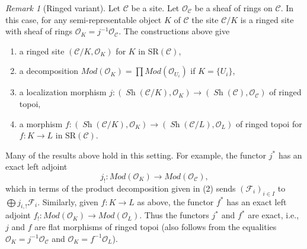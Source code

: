 \documentclass{stacks-project}
\theoremstyle{plain}
\theoremstyle{definition}
\theoremstyle{remark}
\newtheorem{remark}[subsection]{Remark}
\numberwithin{equation}{subsection}
\def\Sh{\mathop{\mathit{Sh}}\nolimits}
\begin{document}
\begin{remark}[Ringed variant]
\label{remark-semi-representable-ringed}
Let $\mathcal{C}$ be a site. Let $\mathcal{O}_\mathcal{C}$
be a sheaf of rings on $\mathcal{C}$. In this case, for any
semi-representable object $K$ of $\mathcal{C}$ the site
$\mathcal{C}/K$ is a ringed site with sheaf
of rings $\mathcal{O}_K = j^{-1}\mathcal{O}_\mathcal{C}$.
The constructions above give
\begin{enumerate}
\item a ringed site $(\mathcal{C}/K, \mathcal{O}_K)$
for $K$ in $\text{SR}(\mathcal{C})$,
\item a decomposition
$\textit{Mod}(\mathcal{O}_K) =
\prod \textit{Mod}(\mathcal{O}_{U_i})$ if $K = \{U_i\}$,
\item a localization morphism
$j : (\Sh(\mathcal{C}/K), \mathcal{O}_K) \to
(\Sh(\mathcal{C}), \mathcal{O}_\mathcal{C})$
of ringed topoi,
\item a morphism
$f : (\Sh(\mathcal{C}/K), \mathcal{O}_K) \to
(\Sh(\mathcal{C}/L), \mathcal{O}_L)$ of ringed topoi
for $f : K \to L$ in $\text{SR}(\mathcal{C})$.
\end{enumerate}
Many of the results above hold in this setting. For example, the
functor $j^*$ has an exact left adjoint
$$
j_! : \textit{Mod}(\mathcal{O}_K) \to \textit{Mod}(\mathcal{O}_\mathcal{C}),
$$
which in terms of the product decomposition given in (2) sends
$(\mathcal{F}_i)_{i \in I}$ to $\bigoplus j_{i, !}\mathcal{F}_i$.
Similarly, given $f : K \to L$ as above, the functor $f^*$ has
an exact left adjoint
$f_! : \textit{Mod}(\mathcal{O}_K) \to \textit{Mod}(\mathcal{O}_L)$.
Thus the functors $j^*$ and $f^*$ are exact, i.e.,
$j$ and $f$ are flat morphisms of ringed topoi (also follows
from the equalities $\mathcal{O}_K = j^{-1}\mathcal{O}_\mathcal{C}$
and $\mathcal{O}_K = f^{-1}\mathcal{O}_L$).
\end{remark}
\end{document}
